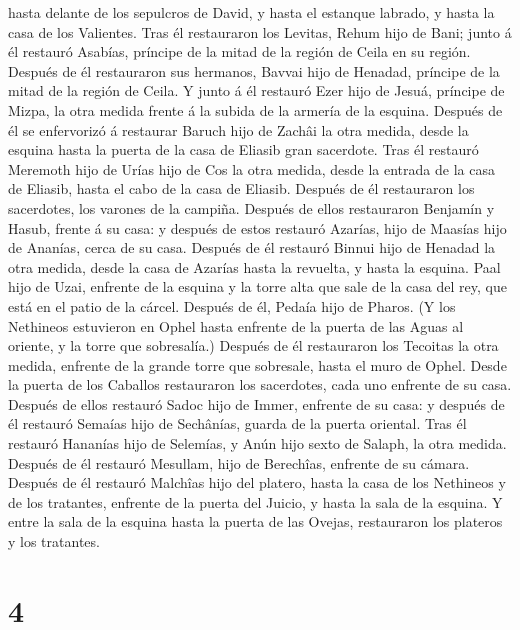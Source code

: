 hasta delante de los sepulcros de David, y hasta el estanque labrado, y
hasta la casa de los Valientes.  Tras él restauraron los
Levitas, Rehum hijo de Bani; junto á él restauró Asabías, príncipe de la
mitad de la región de Ceila en su región.  Después de él
restauraron sus hermanos, Bavvai hijo de Henadad, príncipe de la mitad
de la región de Ceila.  Y junto á él restauró Ezer hijo de
Jesuá, príncipe de Mizpa, la otra medida frente á la subida de la
armería de la esquina.  Después de él se enfervorizó á
restaurar Baruch hijo de Zachâi la otra medida, desde la esquina hasta
la puerta de la casa de Eliasib gran sacerdote.  Tras él
restauró Meremoth hijo de Urías hijo de Cos la otra medida, desde la
entrada de la casa de Eliasib, hasta el cabo de la casa de Eliasib.
 Después de él restauraron los sacerdotes, los varones de
la campiña.  Después de ellos restauraron Benjamín y Hasub,
frente á su casa: y después de estos restauró Azarías, hijo de Maasías
hijo de Ananías, cerca de su casa.  Después de él restauró
Binnui hijo de Henadad la otra medida, desde la casa de Azarías hasta la
revuelta, y hasta la esquina.  Paal hijo de Uzai, enfrente
de la esquina y la torre alta que sale de la casa del rey, que está en
el patio de la cárcel. Después de él, Pedaía hijo de Pharos.
 (Y los Nethineos estuvieron en Ophel hasta enfrente de la
puerta de las Aguas al oriente, y la torre que sobresalía.)
 Después de él restauraron los Tecoitas la otra medida,
enfrente de la grande torre que sobresale, hasta el muro de Ophel.
 Desde la puerta de los Caballos restauraron los
sacerdotes, cada uno enfrente de su casa.  Después de ellos
restauró Sadoc hijo de Immer, enfrente de su casa: y después de él
restauró Semaías hijo de Sechânías, guarda de la puerta oriental.
 Tras él restauró Hananías hijo de Selemías, y Anún hijo
sexto de Salaph, la otra medida. Después de él restauró Mesullam, hijo
de Berechîas, enfrente de su cámara.  Después de él
restauró Malchîas hijo del platero, hasta la casa de los Nethineos y de
los tratantes, enfrente de la puerta del Juicio, y hasta la sala de la
esquina.  Y entre la sala de la esquina hasta la puerta de
las Ovejas, restauraron los plateros y los tratantes.

\hypertarget{section-3}{%
\section{4}\label{section-3}}

